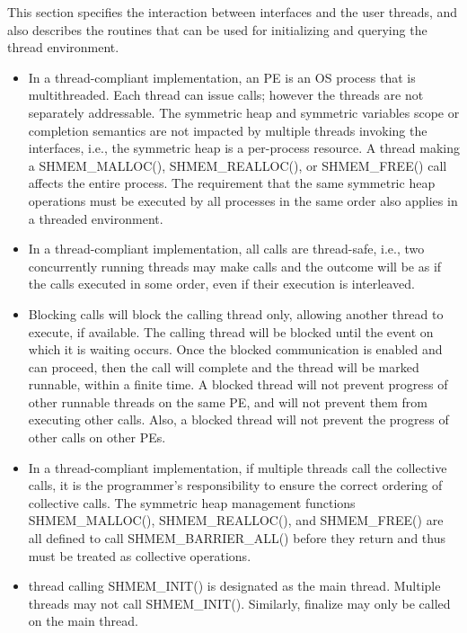 This section specifies the interaction between \openshmem{} interfaces and the
user threads, and also describes the routines that can be used for initializing and 
querying the thread environment.
 

\begin{itemize}

\item
In a thread-compliant implementation, an \openshmem{} PE is an OS process that
is multithreaded. Each thread can issue \openshmem{} calls; however the threads
are not separately addressable. The symmetric heap and symmetric variables scope
or completion semantics are not impacted by multiple threads invoking the
\openshmem{} interfaces, i.e., the symmetric heap is a per-process resource. A
thread making a SHMEM\_MALLOC(), SHMEM\_REALLOC(), or SHMEM\_FREE() call affects
the entire process. The requirement that the same symmetric heap operations must
be executed by all processes in the same order also applies in a threaded
environment.
                                    	
\item In a thread-compliant implementation, 
all \openshmem{} calls are thread-safe, i.e., two concurrently running threads
may make \openshmem{} calls and the outcome will be as if the calls executed in
some order, even if their execution is interleaved.

\item Blocking \openshmem{} calls will block the calling thread only, allowing another
thread to execute, if available. The calling thread will be blocked until the
event on which it is waiting occurs. Once the blocked communication is enabled
and can proceed, then the call will complete and the thread will be marked
runnable, within a finite time. A blocked thread will not prevent progress of
other runnable threads on the same \ac{PE}, and will not prevent them from
executing other \openshmem{} calls. Also, a blocked thread will not prevent the
progress of other \openshmem{} calls on other \acp{PE}. 
 
\item
In a thread-compliant implementation, if multiple threads call the collective
calls, it is the programmer's responsibility to ensure the correct ordering of
collective calls.  The symmetric heap management functions SHMEM\_MALLOC(),
SHMEM\_REALLOC(), and SHMEM\_FREE() are all defined to call
SHMEM\_BARRIER\_ALL() before they return and thus must be treated as collective
operations.

\item
\openshmem{} thread calling SHMEM\_INIT() is designated as the main thread.
Multiple threads may not call SHMEM\_INIT(). Similarly, \openshmem{} finalize
may only be called on the main thread.

\end{itemize} 
 
